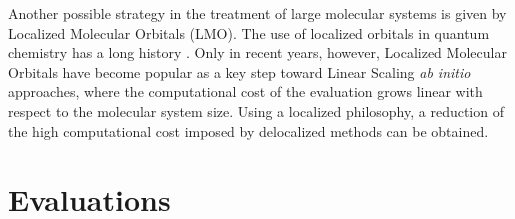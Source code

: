 Another possible strategy in the treatment of large molecular systems is
given by Localized Molecular Orbitals (LMO). The use of localized orbitals in
quantum chemistry has a long history \cite{chavet-ladiqc}.  Only in recent
years, however, Localized Molecular Orbitals have become popular as a key
step toward Linear Scaling \textit{ab initio} approaches, where the
computational cost of the evaluation grows linear with respect to the
molecular system size. Using a localized philosophy, a reduction of the
high computational cost imposed by delocalized methods can be obtained.





\pagebreak
\section{Evaluations}




